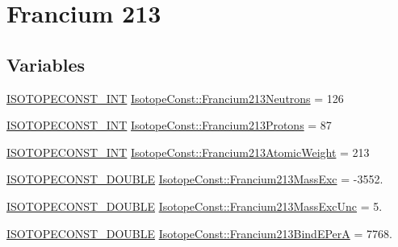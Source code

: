 \hypertarget{group___isotope_const-_francium-_fr213}{}\section{Francium 213}
\label{group___isotope_const-_francium-_fr213}
\subsection*{Variables}
\begin{DoxyCompactItemize}
\item 
\mbox{\hyperlink{group___isotope_const-_macros_ga5f18360b3e99483a35c32d789e62621c}{I\+S\+O\+T\+O\+P\+E\+C\+O\+N\+S\+T\+\_\+\+I\+NT}} \mbox{\hyperlink{group___isotope_const-_francium-_fr213_ga566ddf7fa5a3a56496dc3e7ca8b79299}{Isotope\+Const\+::\+Francium213\+Neutrons}} = 126
\item 
\mbox{\hyperlink{group___isotope_const-_macros_ga5f18360b3e99483a35c32d789e62621c}{I\+S\+O\+T\+O\+P\+E\+C\+O\+N\+S\+T\+\_\+\+I\+NT}} \mbox{\hyperlink{group___isotope_const-_francium-_fr213_ga215957680295e01a3225be80ec2c66aa}{Isotope\+Const\+::\+Francium213\+Protons}} = 87
\item 
\mbox{\hyperlink{group___isotope_const-_macros_ga5f18360b3e99483a35c32d789e62621c}{I\+S\+O\+T\+O\+P\+E\+C\+O\+N\+S\+T\+\_\+\+I\+NT}} \mbox{\hyperlink{group___isotope_const-_francium-_fr213_gaa249bbfcd4cf2eb15072cd94934f0a41}{Isotope\+Const\+::\+Francium213\+Atomic\+Weight}} = 213
\item 
\mbox{\hyperlink{group___isotope_const-_macros_ga8f45a7272ce02c0b4c65c44636ed719a}{I\+S\+O\+T\+O\+P\+E\+C\+O\+N\+S\+T\+\_\+\+D\+O\+U\+B\+LE}} \mbox{\hyperlink{group___isotope_const-_francium-_fr213_gab3ac2866f7d87dc4ddd93857082e579b}{Isotope\+Const\+::\+Francium213\+Mass\+Exc}} = -\/3552.
\item 
\mbox{\hyperlink{group___isotope_const-_macros_ga8f45a7272ce02c0b4c65c44636ed719a}{I\+S\+O\+T\+O\+P\+E\+C\+O\+N\+S\+T\+\_\+\+D\+O\+U\+B\+LE}} \mbox{\hyperlink{group___isotope_const-_francium-_fr213_ga117693967e03b268d32656a0951694b3}{Isotope\+Const\+::\+Francium213\+Mass\+Exc\+Unc}} = 5.
\item 
\mbox{\hyperlink{group___isotope_const-_macros_ga8f45a7272ce02c0b4c65c44636ed719a}{I\+S\+O\+T\+O\+P\+E\+C\+O\+N\+S\+T\+\_\+\+D\+O\+U\+B\+LE}} \mbox{\hyperlink{group___isotope_const-_francium-_fr213_ga2cf87824acc6407e2ff2048565b89fc6}{Isotope\+Const\+::\+Francium213\+Bind\+E\+PerA}} = 7768.
\item 

\end{DoxyCompactItemize}
